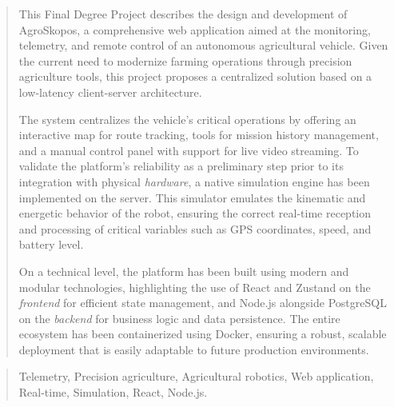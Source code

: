 \documentclass[a4paper,12pt,twoside]{memoir}
\begin{document}
\renewcommand*\abstractname{Abstract}
\begin{abstract}
This Final Degree Project describes the design and development of AgroSkopos, a comprehensive web application aimed at the monitoring, telemetry, and remote control of an autonomous agricultural vehicle. Given the current need to modernize farming operations through precision agriculture tools, this project proposes a centralized solution based on a low-latency client-server architecture.

The system centralizes the vehicle's critical operations by offering an interactive map for route tracking, tools for mission history management, and a manual control panel with support for live video streaming. To validate the platform's reliability as a preliminary step prior to its integration with physical \textit{hardware}, a native simulation engine has been implemented on the server. This simulator emulates the kinematic and energetic behavior of the robot, ensuring the correct real-time reception and processing of critical variables such as GPS coordinates, speed, and battery level.

On a technical level, the platform has been built using modern and modular technologies, highlighting the use of React and Zustand on the \textit{frontend} for efficient state management, and Node.js alongside PostgreSQL on the \textit{backend} for business logic and data persistence. The entire ecosystem has been containerized using Docker, ensuring a robust, scalable deployment that is easily adaptable to future production environments.
\end{abstract}

\renewcommand*\abstractname{Keywords}
\begin{abstract}
Telemetry, Precision agriculture, Agricultural robotics, Web application, Real-time, Simulation, React, Node.js.
\end{abstract}

\clearpage

\tableofcontents

\clearpage

\listoffigures

\clearpage

\listoftables
\clearpage

\mainmatter











\end{document}
